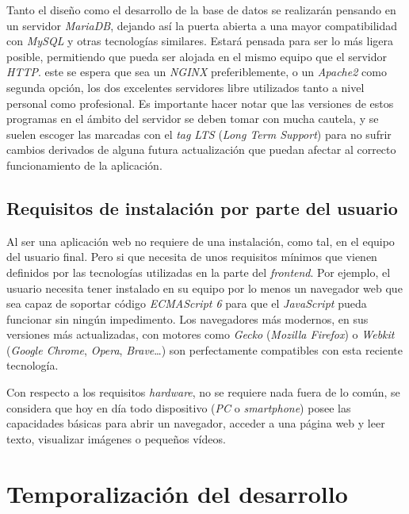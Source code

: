 \documentclass[12pt,a4paper,titlepage]{article}
\begin{document}
    Tanto el diseño como el desarrollo de la base de datos se realizarán pensando en un servidor \emph{MariaDB}, dejando así la puerta abierta a una mayor compatibilidad con \emph{MySQL} y otras tecnologías similares. Estará pensada para ser lo más ligera posible, permitiendo que pueda ser alojada en el mismo equipo que el servidor \emph{HTTP}. este se espera que sea un \textit{NGINX} preferiblemente, o un \textit{Apache2} como segunda opción, los dos excelentes servidores libre utilizados tanto a nivel personal como profesional. Es importante hacer notar que las versiones de estos programas en el ámbito del servidor se deben tomar con mucha cautela, y se suelen escoger las marcadas con el \textit{tag} \textit{LTS} (\textit{Long Term Support}) para no sufrir cambios derivados de alguna futura actualización que puedan afectar al correcto funcionamiento de la aplicación.

    \subsection{Requisitos de instalación por parte del usuario}

    Al ser una aplicación web no requiere de una instalación, como tal, en el equipo del usuario final. Pero si que necesita de unos requisitos mínimos que vienen definidos por las tecnologías utilizadas en la parte del \textit{frontend}. Por ejemplo, el usuario necesita tener instalado en su equipo por lo menos un navegador web que sea capaz de soportar código \emph{ECMAScript 6} para que el \emph{JavaScript} pueda funcionar sin ningún impedimento. Los navegadores más modernos, en sus versiones más actualizadas, con motores como \emph{Gecko} (\emph{Mozilla Firefox}) o \emph{Webkit} (\emph{Google Chrome}, \emph{Opera}, \emph{Brave}\dots) son perfectamente compatibles con esta reciente tecnología.

    Con respecto a los requisitos \textit{hardware}, no se requiere nada fuera de lo común, se considera que hoy en día todo dispositivo (\textit{PC} o \textit{smartphone}) posee las capacidades básicas para abrir un navegador, acceder a una página web y leer texto, visualizar imágenes o pequeños vídeos.

    \section{Temporalización del desarrollo}

\end{document}
